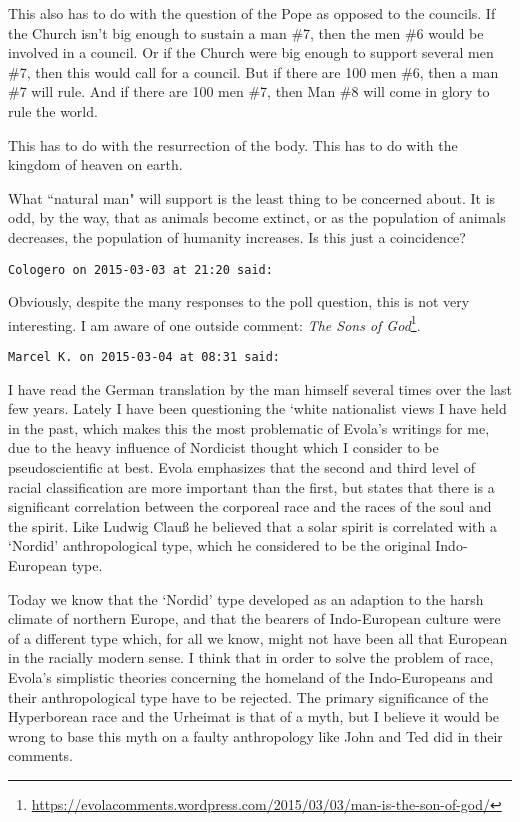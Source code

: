 \begin{footnotesize}
\begin{sffamily}
This also has to do with the question of the Pope as opposed to the councils. If the Church isn't big enough to sustain a man \#7, then the men \#6 would be involved in a council. Or if the Church were big enough to support several men \#7, then this would call for a council. But if there are 100 men \#6, then a man \#7 will rule. And if there are 100 men \#7, then Man \#8 will come in glory to rule the world.

This has to do with the resurrection of the body. This has to do with the kingdom of heaven on earth.

What ``natural man" will support is the least thing to be concerned about. It is odd, by the way, that as animals become extinct, or as the population of animals decreases, the population of humanity increases. Is this just a coincidence?


\hfill

\texttt{Cologero on 2015-03-03 at 21:20 said: }

Obviously, despite the many responses to the poll question, this is not very interesting. I am aware of one outside comment: \textit{The Sons of God}\footnote{\url{https://evolacomments.wordpress.com/2015/03/03/man-is-the-son-of-god/}}.


\hfill

\texttt{Marcel K. on 2015-03-04 at 08:31 said: }

I have read the German translation by the man himself several times over the last few years. Lately I have been questioning the `white nationalist views I have held in the past, which makes this the most problematic of Evola's writings for me, due to the heavy influence of Nordicist thought which I consider to be pseudoscientific at best. Evola emphasizes that the second and third level of racial classification are more important than the first, but states that there is a significant correlation between the corporeal race and the races of the soul and the spirit. Like Ludwig Clauß he believed that a solar spirit is correlated with a `Nordid' anthropological type, which he considered to be the original Indo-European type.

Today we know that the `Nordid' type developed as an adaption to the harsh climate of northern Europe, and that the bearers of Indo-European culture were of a different type which, for all we know, might not have been all that European in the racially modern sense. I think that in order to solve the problem of race, Evola's simplistic theories concerning the homeland of the Indo-Europeans and their anthropological type have to be rejected. The primary significance of the Hyperborean race and the Urheimat is that of a myth, but I believe it would be wrong to base this myth on a faulty anthropology like John and Ted did in their comments.


\end{sffamily}
\end{footnotesize}
